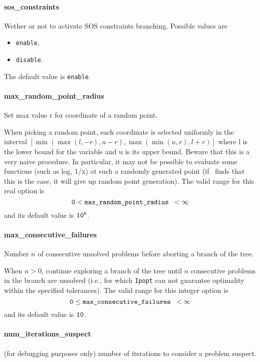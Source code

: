 \paragraph{sos\_constraints}
\label{sos_constraint}
Wether or not to activate SOS constraints branching. Possible values are
\begin{itemize}
 \item {\tt enable},
\item {\tt disable}.
\end{itemize}
The default value is {\tt enable}.


\paragraph{max\_random\_point\_radius}
\label{max_random_point_radius}
Set max value r for coordinate of a random point.

 When picking a random point, each coordinate is selected uniformly
in the interval $[\min(\max(l,-r),u-r),
\max(\min(u,r),l+r)]$ where l is the lower bound
for the variable and u is its upper bound.
Beware that this is a very naive procedure. In particular,
it may not be possible to evaluate some functions (such as log, 1/x)
at such a randomly generated point (if \Bonmin\  finds that this is the case,
it will give up random point generation).
The valid range for this real option is
$${\tt 0} <  \hbox{\tt max\_random\_point\_radius } <  \infty$$
and its default value is ${\tt 10^{5}}$.


\paragraph{max\_consecutive\_failures}
\label{max_consecutive_failures}
Number $n$ of consecutive unsolved problems before aborting
a branch of the tree.

 When $n > 0$, continue exploring a branch of the
tree until $n$ consecutive problems in the branch
are unsolved (i.e., for
which {\tt Ipopt} can not guarantee optimality within
the specified tolerances). The valid range for this integer option is
$${\tt 0} \le \hbox{\tt max\_consecutive\_failures } <  \infty$$
and its default value is ${\tt 10}$.


\paragraph{num\_iterations\_suspect}
\label{num_iterations_suspect}(for debugging purposes only) number of iterations to consider a problem
suspect.

